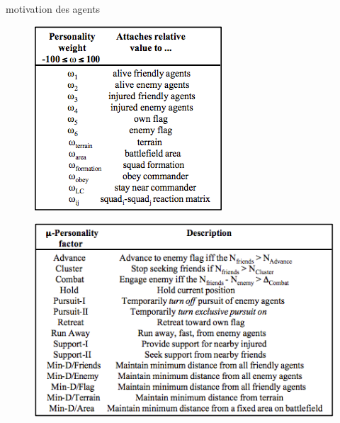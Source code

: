 \documentclass{article}
\begin{document}
motivation des agents
\begin{figure}[H]
	\begin{centering}
	\includegraphics[]{../ressources/einstein_personality_weight}
	\caption{}
	\end{centering}
\end{figure}
\begin{figure}[H]
	\begin{centering}
	\includegraphics[]{../ressources/einstein_personality_factor}
	\caption{}
	\end{centering}
\end{figure}
\end{document}
